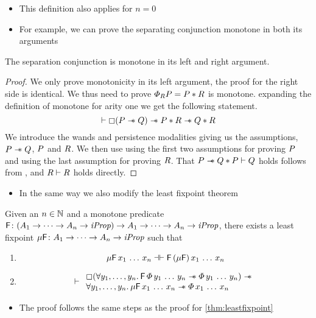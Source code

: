 \documentclass[thesis.tex]{subfiles}
\begin{document}
\begin{itemize}
    \item This definition also applies for $n=0$
    \item For example, we can prove the separating conjunction monotone in both its arguments
\end{itemize}
\begin{lemma}
    \label{lem:sepmonomar}
    The separation conjunction is monotone in its left and right argument.
\end{lemma}
\begin{proof}
    We only prove monotonicity in its left argument, the proof for the right side is identical.
    We thus need to prove $\varPhi_RP = P * R$ is monotone.
    expanding the definition of monotone for arity one we get the following statement.
    \[\vdash \mathop{\boxempty}(P \mathrel{-\!\!\ast} Q) \mathrel{-\!\!\ast} P * R \mathrel{-\!\!\ast} Q * R\]
    We introduce the wands and persistence modalities giving us the assumptions, $P\mathrel{-\!\!\ast}Q$, $P$ and $R$.
    We then use  using the first two assumptions for proving $P$ and using the last assumption for proving $R$.
    That $P \mathrel{-\!\!\ast} Q * P \vdash Q$ holds follows from , and $R \vdash R$ holds directly.
\end{proof}
\begin{itemize}
    \item In the same way we also modify the least fixpoint theorem
\end{itemize}

\begin{theorem}
    \label{thm:leastfixpointmar}
    Given an $n\in\mathbb{N}$ and a monotone predicate $\textsf{\upshape F}\colon (A_1 \to \dots \to A_n \to \textit{iProp}) \to  A_1 \to \dots \to A_n \to \textit{iProp}$, there exists a least fixpoint $\mu\textsf{\upshape F}\colon A_1 \to \dots \to A_n \to \textit{iProp}$ such that
    \begin{enumerate}
        \item \[ \mu\textsf{\upshape F}\, x_1\,\dots\,x_n \mathrel{\dashv\vdash} \textsf{\upshape F}\, (\mu\textsf{\upshape F})\, x_1\,\dots\,x_n \]
        \item \[
                  \proves \begin{array}{l}
                      \always (\All \varB_1,\dots,\varB_n. \hopred\, \pred\, \varB_1\,\dots\,\varB_n \wand \pred\, \varB_1\,\dots\,\varB_n) \wand \\
                      \All \varB_1,\dots,\varB_n. \lfp\hopred\, \var_1\,\dots\,\var_n \wand \pred\, \var_1\,\dots\,\var_n
                  \end{array}
              \]
    \end{enumerate}
\end{theorem}
\begin{itemize}
    \item The proof follows the same steps as the proof for \cref*{thm:leastfixpoint}
\end{itemize}
\end{document}
